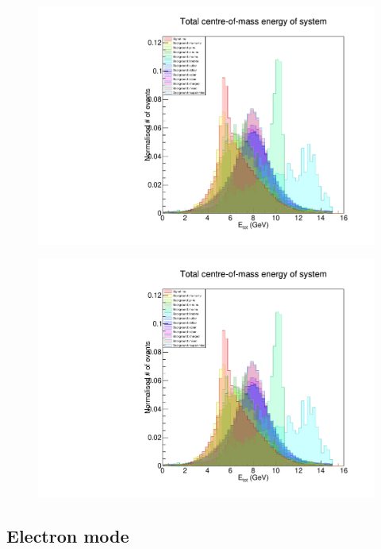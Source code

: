 \documentclass[12pt]{thesis}  %
\begin{document}
\begin{figure}[h]
\centering
\begin{minipage}{.5\textwidth}
  \centering
  \includegraphics[width=\linewidth]{images/stack/stack_cut6_totalCM_E.pdf}
  \label{fig:test1}
\end{minipage}%
\begin{minipage}{.5\textwidth}
  \centering
  \includegraphics[width=\linewidth]{images/stack/stack_cut6_totalCM_E.pdf}
  \label{fig:test2}
\end{minipage}
\end{figure}

\subsection{Electron mode}
\end{document}
